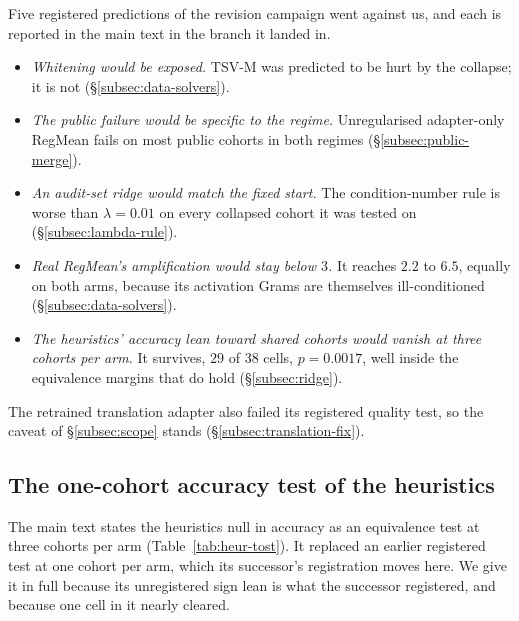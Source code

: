 Five registered predictions of the revision campaign went against us, and
each is reported in the main text in the branch it landed in.
\begin{itemize}[leftmargin=*,itemsep=2pt,topsep=2pt]
\item \emph{Whitening would be exposed.} TSV-M was predicted to be hurt by the
  collapse; it is not (\S\ref{subsec:data-solvers}).
\item \emph{The public failure would be specific to the regime.} Unregularised
  adapter-only RegMean fails on most public cohorts in both regimes
  (\S\ref{subsec:public-merge}).
\item \emph{An audit-set ridge would match the fixed start.} The
  condition-number rule is worse than $\lambda = 0.01$ on every collapsed cohort
  it was tested on (\S\ref{subsec:lambda-rule}).
\item \emph{Real RegMean's amplification would stay below $3$.} It reaches $2.2$
  to $6.5$, equally on both arms, because its activation Grams are themselves
  ill-conditioned (\S\ref{subsec:data-solvers}).
\item \emph{The heuristics' accuracy lean toward shared cohorts would vanish
  at three cohorts per arm.} It survives, $29$ of $38$ cells, $p = 0.0017$,
  well inside the equivalence margins that do hold (\S\ref{subsec:ridge}).
\end{itemize}
The retrained translation adapter also failed its registered quality test,
so the caveat of \S\ref{subsec:scope} stands (\S\ref{subsec:translation-fix}).
\subsection{The one-cohort accuracy test of the heuristics}
\label{subsec:heur-n1}

The main text states the heuristics null in accuracy as an equivalence test at
three cohorts per arm (Table~\ref{tab:heur-tost}). It replaced an earlier
registered test at one cohort per arm, which its successor's registration moves
here. We give it in full because its unregistered sign lean is what the
successor registered, and because one cell in it nearly cleared.

